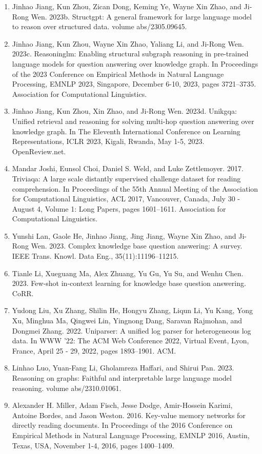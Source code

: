 \documentclass[11pt,UTF8,fontset=fandol]{ctexart}
\begin{document}
\begin{enumerate}[leftmargin=2em]
\item Jinhao Jiang, Kun Zhou, Zican Dong, Keming Ye, Wayne Xin Zhao, and Ji-Rong Wen. 2023b. Structgpt: A general framework for large language model to reason over structured data. volume abs/2305.09645.
\item Jinhao Jiang, Kun Zhou, Wayne Xin Zhao, Yaliang Li, and Ji-Rong Wen. 2023c. Reasoninglm: Enabling structural subgraph reasoning in pre-trained language models for question answering over knowledge graph. In Proceedings of the 2023 Conference on Empirical Methods in Natural Language Processing, EMNLP 2023, Singapore, December 6-10, 2023, pages 3721--3735. Association for Computational Linguistics.
\item Jinhao Jiang, Kun Zhou, Xin Zhao, and Ji-Rong Wen. 2023d. Unikgqa: Unified retrieval and reasoning for solving multi-hop question answering over knowledge graph. In The Eleventh International Conference on Learning Representations, ICLR 2023, Kigali, Rwanda, May 1-5, 2023. OpenReview.net.
\item Mandar Joshi, Eunsol Choi, Daniel S. Weld, and Luke Zettlemoyer. 2017. Triviaqa: A large scale distantly supervised challenge dataset for reading comprehension. In Proceedings of the 55th Annual Meeting of the Association for Computational Linguistics, ACL 2017, Vancouver, Canada, July 30 - August 4, Volume 1: Long Papers, pages 1601--1611. Association for Computational Linguistics.
\item Yunshi Lan, Gaole He, Jinhao Jiang, Jing Jiang, Wayne Xin Zhao, and Ji-Rong Wen. 2023. Complex knowledge base question answering: A survey. IEEE Trans. Knowl. Data Eng., 35(11):11196--11215.
\item Tianle Li, Xueguang Ma, Alex Zhuang, Yu Gu, Yu Su, and Wenhu Chen. 2023. Few-shot in-context learning for knowledge base question answering. CoRR.
\item Yudong Liu, Xu Zhang, Shilin He, Hongyu Zhang, Liqun Li, Yu Kang, Yong Xu, Minghua Ma, Qingwei Lin, Yingnong Dang, Saravan Rajmohan, and Dongmei Zhang. 2022. Uniparser: A unified log parser for heterogeneous log data. In WWW '22: The ACM Web Conference 2022, Virtual Event, Lyon, France, April 25 - 29, 2022, pages 1893--1901. ACM.
\item Linhao Luo, Yuan-Fang Li, Gholamreza Haffari, and Shirui Pan. 2023. Reasoning on graphs: Faithful and interpretable large language model reasoning. volume abs/2310.01061.
\item Alexander H. Miller, Adam Fisch, Jesse Dodge, Amir-Hossein Karimi, Antoine Bordes, and Jason Weston. 2016. Key-value memory networks for directly reading documents. In Proceedings of the 2016 Conference on Empirical Methods in Natural Language Processing, EMNLP 2016, Austin, Texas, USA, November 1-4, 2016, pages 1400--1409.

\end{enumerate}
\end{document}
